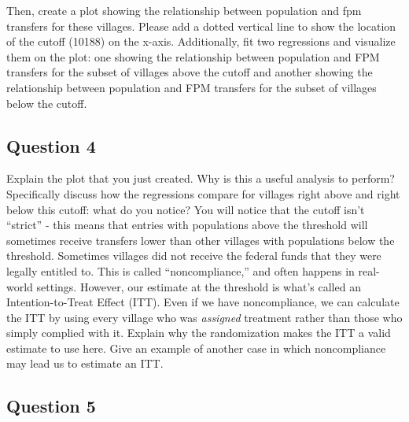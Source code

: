 \documentclass[]{article}
\begin{document}
Then, create a plot showing the relationship between population and fpm
transfers for these villages. Please add a dotted vertical line to show
the location of the cutoff (10188) on the x-axis. Additionally, fit two
regressions and visualize them on the plot: one showing the relationship
between population and FPM transfers for the subset of villages above
the cutoff and another showing the relationship between population and
FPM transfers for the subset of villages below the cutoff.

\subsection{Question 4}\label{question-4}

Explain the plot that you just created. Why is this a useful analysis to
perform? Specifically discuss how the regressions compare for villages
right above and right below this cutoff: what do you notice? You will
notice that the cutoff isn't ``strict'' - this means that entries with
populations above the threshold will sometimes receive transfers lower
than other villages with populations below the threshold. Sometimes
villages did not receive the federal funds that they were legally
entitled to. This is called ``noncompliance,'' and often happens in
real-world settings. However, our estimate at the threshold is what's
called an Intention-to-Treat Effect (ITT). Even if we have
noncompliance, we can calculate the ITT by using every village who was
\emph{assigned} treatment rather than those who simply complied with it.
Explain why the randomization makes the ITT a valid estimate to use
here. Give an example of another case in which noncompliance may lead us
to estimate an ITT.

\subsection{Question 5}\label{question-5}
\end{document}
